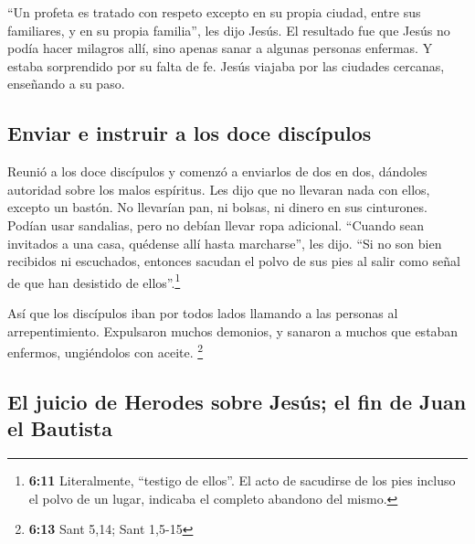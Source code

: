  ``Un profeta es tratado con respeto excepto en su propia
ciudad, entre sus familiares, y en su propia familia'', les dijo Jesús.
 El resultado fue que Jesús no podía hacer milagros allí,
sino apenas sanar a algunas personas enfermas.  Y estaba
sorprendido por su falta de fe. Jesús viajaba por las ciudades cercanas,
enseñando a su paso.

\hypertarget{enviar-e-instruir-a-los-doce-discuxedpulos}{%
\subsection{Enviar e instruir a los doce
discípulos}\label{enviar-e-instruir-a-los-doce-discuxedpulos}}

 Reunió a los doce discípulos y comenzó a enviarlos de dos
en dos, dándoles autoridad sobre los malos espíritus.  Les
dijo que no llevaran nada con ellos, excepto un bastón. No llevarían
pan, ni bolsas, ni dinero en sus cinturones.  Podían usar
sandalias, pero no debían llevar ropa adicional. 
``Cuando sean invitados a una casa, quédense allí hasta marcharse'', les
dijo.  ``Si no son bien recibidos ni escuchados, entonces
sacudan el polvo de sus pies al salir como señal de que han desistido de
ellos''.\footnote{\textbf{6:11} Literalmente, ``testigo de ellos''. El
  acto de sacudirse de los pies incluso el polvo de un lugar, indicaba
  el completo abandono del mismo.}

 Así que los discípulos iban por todos lados llamando a
las personas al arrepentimiento.  Expulsaron muchos
demonios, y sanaron a muchos que estaban enfermos, ungiéndolos con
aceite. \footnote{\textbf{6:13} Sant 5,14; Sant 1,5-15}

\hypertarget{el-juicio-de-herodes-sobre-jesuxfas-el-fin-de-juan-el-bautista}{%
\subsection{El juicio de Herodes sobre Jesús; el fin de Juan el
Bautista}\label{el-juicio-de-herodes-sobre-jesuxfas-el-fin-de-juan-el-bautista}}

